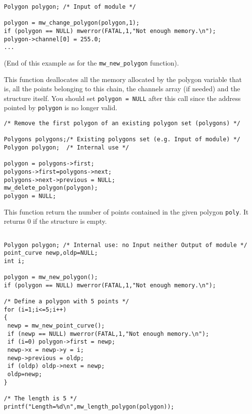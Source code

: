 \Next
\Example
\begin{verbatim}
Polygon polygon; /* Input of module */

polygon = mw_change_polygon(polygon,1);
if (polygon == NULL) mwerror(FATAL,1,"Not enough memory.\n");
polygon->channel[0] = 255.0;
...
\end{verbatim}
(End of this example as for the \verb+mw_new_polygon+ function).

\newpage %


\Description
This function deallocates all the memory allocated by the polygon variable that is, all the points belonging to this chain, the channels array (if needed) and the \polygon structure itself.
You should set \verb+polygon = NULL+ after this call since the address pointed
by \verb+polygon+ is no longer valid.

\Next
\Example
\begin{verbatim}
/* Remove the first polygon of an existing polygon set (polygons) */

Polygons polygons;/* Existing polygons set (e.g. Input of module) */
Polygon polygon;  /* Internal use */

polygon = polygons->first;
polygons->first=polygons->next;
polygons->next->previous = NULL;
mw_delete_polygon(polygon);
polygon = NULL;
\end{verbatim}

\newpage %


\Description
This function return the number of points contained in the given
polygon \verb+poly+. It returns $0$ if the structure is empty.

\Next
\Example
\begin{verbatim}

Polygon polygon; /* Internal use: no Input neither Output of module */
point_curve newp,oldp=NULL;
int i;

polygon = mw_new_polygon();
if (polygon == NULL) mwerror(FATAL,1,"Not enough memory.\n");

/* Define a polygon with 5 points */
for (i=1;i<=5;i++)
{
 newp = mw_new_point_curve();
 if (newp == NULL) mwerror(FATAL,1,"Not enough memory.\n");
 if (i=0) polygon->first = newp;
 newp->x = newp->y = i;
 newp->previous = oldp;
 if (oldp) oldp->next = newp;
 oldp=newp;
} 

/* The length is 5 */
printf("Length=%d\n",mw_length_polygon(polygon));

\end{verbatim}
\newpage %

